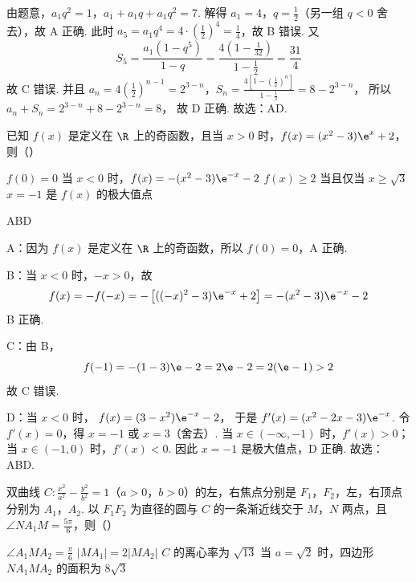 \documentclass[UTF8,a4paper,oneside,11pt]{ctexbook}
\begin{document}
\begin{solution}
由题意，\(a_1q^2=1\)，\(a_1+a_1q+a_1q^2=7\).
解得 \(a_1=4\)，\(q=\frac12\)（另一组 \(q<0\) 舍去），故 A 正确.
此时 \(a_5=a_1q^4=4\cdot\left(\frac12\right)^4=\frac14\)，故 B 错误.
又
\[
S_5=\frac{a_1(1-q^5)}{1-q}
=\frac{4\left(1-\frac{1}{32}\right)}{1-\frac12}
=\frac{31}{4}
\]
故 C 错误.
并且
\(a_n=4\left(\frac12\right)^{n-1}=2^{3-n}\)，\(S_n=\frac{4\left[1-\left(\frac12\right)^n\right]}{1-\frac12}=8-2^{3-n}\)，
所以
\(a_n+S_n=2^{3-n}+8-2^{3-n}=8\)，
故 D 正确. 故选：AD.
\end{solution}

\begin{problem}
已知 \(f(x)\) 是定义在 \(\R\) 上的奇函数，且当 \(x>0\) 时，\(f(x)=(x^2-3)\e^x+2\)，则（\quad）

\choices
    {\(f(0)=0\)}
    {当 \(x<0\) 时，\(f(x)=-(x^2-3)\e^{-x}-2\)}
    {\(f(x)\ge 2\) 当且仅当 \(x\ge \sqrt3\)}
    {\(x=-1\) 是 \(f(x)\) 的极大值点}
\end{problem}

\begin{answer}
ABD
\end{answer}

\begin{solution}
A：因为 \(f(x)\) 是定义在 \(\R\) 上的奇函数，所以 \(f(0)=0\)，A 正确.

B：当 \(x<0\) 时，\(-x>0\)，故
\[
f(x)=-f(-x)=-\left[((-x)^2-3)\e^{-x}+2\right]=-(x^2-3)\e^{-x}-2
\]
B 正确.

C：由 B，
\[
f(-1)=-(1-3)\e-2=2\e-2=2(\e-1)>2
\]
故 C 错误.

D：当 \(x<0\) 时，
\(f(x)=(3-x^2)\e^{-x}-2\)，
于是
\(f'(x)=(x^2-2x-3)\e^{-x}\).
令 \(f'(x)=0\)，得 \(x=-1\) 或 \(x=3\)（舍去）. 当 \(x\in(-\infty,-1)\) 时，\(f'(x)>0\)；当 \(x\in(-1,0)\) 时，\(f'(x)<0\). 因此 \(x=-1\) 是极大值点，D 正确. 故选：ABD.
\end{solution}

\begin{problem}
双曲线 \(C:\frac{x^2}{a^2}-\frac{y^2}{b^2}=1\)（\(a>0\)，\(b>0\)）的左，右焦点分别是 \(F_1\)，\(F_2\)，左，右顶点分别为 \(A_1\)，\(A_2\). 以 \(F_1F_2\) 为直径的圆与 \(C\) 的一条渐近线交于 \(M\)，\(N\) 两点，且 \(\angle NA_1M=\frac{5\pi}{6}\)，则（\quad）

\choices
    {\(\angle A_1MA_2=\frac{\pi}{6}\)}
    {\(|MA_1|=2|MA_2|\)}
    {\(C\) 的离心率为 \(\sqrt{13}\)}
    {当 \(a=\sqrt2\) 时，四边形 \(NA_1MA_2\) 的面积为 \(8\sqrt3\)}
\end{problem}
\end{document}
